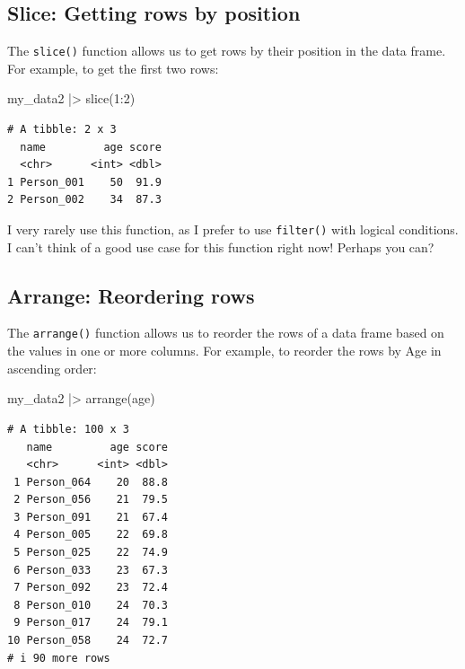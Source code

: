 \documentclass[
  letterpaper,
  8pt,
  a4paper]{book}
\newenvironment{Shaded}{\begin{snugshade}}{\end{snugshade}}
\newcommand{\DecValTok}[1]{\textcolor[rgb]{0.68,0.00,0.00}{#1}}
\newcommand{\FunctionTok}[1]{\textcolor[rgb]{0.28,0.35,0.67}{#1}}
\newcommand{\NormalTok}[1]{\textcolor[rgb]{0.00,0.23,0.31}{#1}}
\newcommand{\SpecialCharTok}[1]{\textcolor[rgb]{0.37,0.37,0.37}{#1}}
\begin{document}
\subsection*{Slice: Getting rows by
position}\label{slice-getting-rows-by-position}

The \texttt{slice()} function allows us to get rows by their position in
the data frame. For example, to get the first two rows:

\begin{Shaded}
\begin{Highlighting}[]
\NormalTok{my\_data2 }\SpecialCharTok{|\textgreater{}} 
  \FunctionTok{slice}\NormalTok{(}\DecValTok{1}\SpecialCharTok{:}\DecValTok{2}\NormalTok{)}
\end{Highlighting}
\end{Shaded}

\begin{verbatim}
# A tibble: 2 x 3
  name         age score
  <chr>      <int> <dbl>
1 Person_001    50  91.9
2 Person_002    34  87.3
\end{verbatim}

I very rarely use this function, as I prefer to use \texttt{filter()}
with logical conditions. I can't think of a good use case for this
function right now! Perhaps you can?

\subsection*{Arrange: Reordering rows}\label{arrange-reordering-rows}

The \texttt{arrange()} function allows us to reorder the rows of a data
frame based on the values in one or more columns. For example, to
reorder the rows by Age in ascending order:

\begin{Shaded}
\begin{Highlighting}[]
\NormalTok{my\_data2 }\SpecialCharTok{|\textgreater{}} 
  \FunctionTok{arrange}\NormalTok{(age)}
\end{Highlighting}
\end{Shaded}

\begin{verbatim}
# A tibble: 100 x 3
   name         age score
   <chr>      <int> <dbl>
 1 Person_064    20  88.8
 2 Person_056    21  79.5
 3 Person_091    21  67.4
 4 Person_005    22  69.8
 5 Person_025    22  74.9
 6 Person_033    23  67.3
 7 Person_092    23  72.4
 8 Person_010    24  70.3
 9 Person_017    24  79.1
10 Person_058    24  72.7
# i 90 more rows
\end{verbatim}
\end{document}
